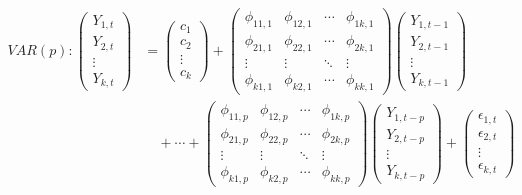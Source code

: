 \begin{equation*}
\begin{aligned}
VAR(p) : 
\begin{pmatrix}
Y_{1,t} \\
Y_{2,t} \\
\vdots \\
Y_{k,t}
\end{pmatrix}
&=
\begin{pmatrix}
c_1 \\
c_2 \\
\vdots \\
c_k
\end{pmatrix}
+
\begin{pmatrix}
\phi_{11,1} & \phi_{12,1} & \cdots & \phi_{1k,1} \\
\phi_{21,1} & \phi_{22,1} & \cdots & \phi_{2k,1} \\
\vdots & \vdots & \ddots & \vdots \\
\phi_{k1,1} & \phi_{k2,1} & \cdots & \phi_{kk,1}
\end{pmatrix}
\begin{pmatrix}
Y_{1,t-1} \\
Y_{2,t-1} \\
\vdots \\
Y_{k,t-1}
\end{pmatrix} \\
&\quad + \cdots 
+ 
\begin{pmatrix}
\phi_{11,p} & \phi_{12,p} & \cdots & \phi_{1k,p} \\
\phi_{21,p} & \phi_{22,p} & \cdots & \phi_{2k,p} \\
\vdots & \vdots & \ddots & \vdots \\
\phi_{k1,p} & \phi_{k2,p} & \cdots & \phi_{kk,p}
\end{pmatrix}
\begin{pmatrix}
Y_{1,t-p} \\
Y_{2,t-p} \\
\vdots \\
Y_{k,t-p}
\end{pmatrix}
+
\begin{pmatrix}
\epsilon_{1,t} \\
\epsilon_{2,t} \\
\vdots \\
\epsilon_{k,t}
\end{pmatrix}
\end{aligned}
\end{equation*}
    


